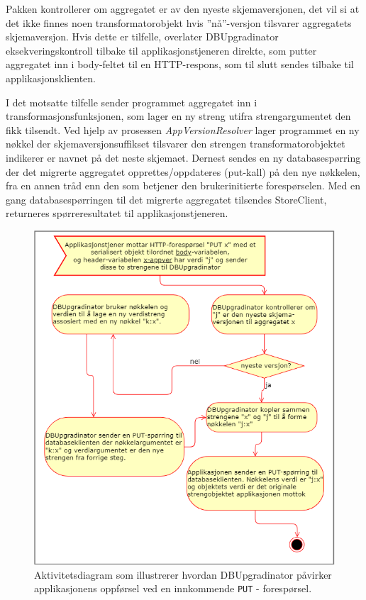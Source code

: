 Pakken kontrollerer om aggregatet er av den nyeste skjemaversjonen, det vil si at det ikke finnes noen transformatorobjekt hvis ''nå''-versjon tilsvarer aggregatets skjemaversjon. Hvis dette er tilfelle, overlater DBUpgradinator eksekveringskontroll tilbake til applikasjonstjeneren direkte, som putter aggregatet inn i body-feltet til en HTTP-respons, som til slutt sendes tilbake til applikasjonsklienten.

I det motsatte tilfelle sender programmet aggregatet inn i transformasjonsfunksjonen, som lager en ny streng utifra strengargumentet den fikk tilsendt. Ved hjelp av prosessen \emph{AppVersionResolver} lager programmet en ny nøkkel der skjemaversjon\-suffikset tilsvarer den strengen transformatorobjektet indikerer er navnet på det neste skjemaet. Dernest sendes en ny databasespørring der det migrerte aggregatet opprettes/oppdateres (put-kall) på den nye nøkkelen, fra en annen tråd enn den som betjener den brukerinitierte forespørselen. Med en gang databasespørringen til det migrerte aggregatet tilsendes StoreClient, returneres spørreresultatet til applikasjonstjeneren.

\begin{figure}[hbtp]
  \centering
  \includegraphics[scale=0.6]{fig/dbupgradinator-prosess-3.png}
  \caption{Aktivitetsdiagram som illustrerer hvordan DBUpgradinator påvirker applikasjonens oppførsel ved en innkommende \texttt{PUT} - forespørsel.}
  \label{fig9}
\end{figure}

